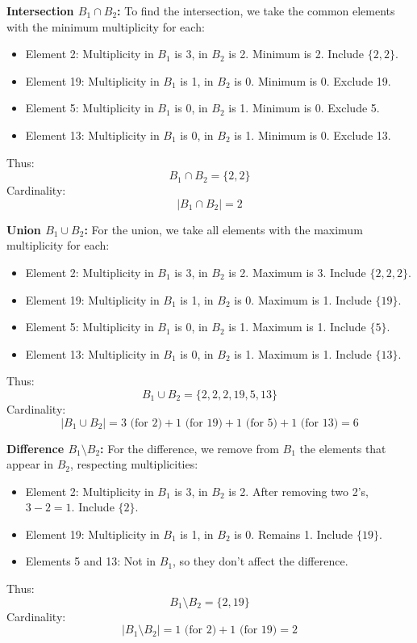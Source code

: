 \documentclass[12pt, a4paper, twoside]{report} %
\begin{document}
\textbf{Intersection \( B_1 \cap B_2 \):}
To find the intersection, we take the common elements with the minimum multiplicity for each:
\begin{itemize}
  \item Element 2: Multiplicity in \( B_1 \) is 3, in \( B_2 \) is 2. Minimum is 2. Include \( \{2, 2\} \).
  \item Element 19: Multiplicity in \( B_1 \) is 1, in \( B_2 \) is 0. Minimum is 0. Exclude 19.
  \item Element 5: Multiplicity in \( B_1 \) is 0, in \( B_2 \) is 1. Minimum is 0. Exclude 5.
  \item Element 13: Multiplicity in \( B_1 \) is 0, in \( B_2 \) is 1. Minimum is 0. Exclude 13.
\end{itemize}
Thus:
\[
B_1 \cap B_2 = \{2, 2\}
\]
Cardinality:
\[
|B_1 \cap B_2| = 2
\]

\textbf{Union \( B_1 \cup B_2 \):}
For the union, we take all elements with the maximum multiplicity for each:
\begin{itemize}
  \item Element 2: Multiplicity in \( B_1 \) is 3, in \( B_2 \) is 2. Maximum is 3. Include \( \{2, 2, 2\} \).
  \item Element 19: Multiplicity in \( B_1 \) is 1, in \( B_2 \) is 0. Maximum is 1. Include \( \{19\} \).
  \item Element 5: Multiplicity in \( B_1 \) is 0, in \( B_2 \) is 1. Maximum is 1. Include \( \{5\} \).
  \item Element 13: Multiplicity in \( B_1 \) is 0, in \( B_2 \) is 1. Maximum is 1. Include \( \{13\} \).
\end{itemize}
Thus:
\[
B_1 \cup B_2 = \{2, 2, 2, 19, 5, 13\}
\]
Cardinality:
\[
|B_1 \cup B_2| = 3 \text{ (for 2)} + 1 \text{ (for 19)} + 1 \text{ (for 5)} + 1 \text{ (for 13)} = 6
\]

\textbf{Difference \( B_1 \setminus B_2 \):}
For the difference, we remove from \( B_1 \) the elements that appear in \( B_2 \), respecting multiplicities:
\begin{itemize}
  \item Element 2: Multiplicity in \( B_1 \) is 3, in \( B_2 \) is 2. After removing two 2’s, \( 3 - 2 = 1 \). Include \( \{2\} \).
  \item Element 19: Multiplicity in \( B_1 \) is 1, in \( B_2 \) is 0. Remains 1. Include \( \{19\} \).
  \item Elements 5 and 13: Not in \( B_1 \), so they don’t affect the difference.
\end{itemize}
Thus:
\[
B_1 \setminus B_2 = \{2, 19\}
\]
Cardinality:
\[
|B_1 \setminus B_2| = 1 \text{ (for 2)} + 1 \text{ (for 19)} = 2
\]
\end{document}
